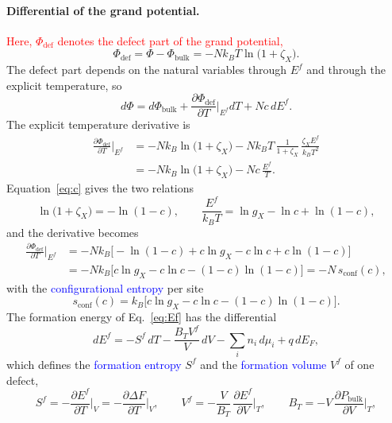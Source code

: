 \documentclass[11pt]{article}      %
\numberwithin{equation}{section}   %
\begin{document}
\paragraph{Differential of the grand potential.}
\textcolor{red}{Here, $\Phi_{\text{def}}$ denotes the defect part of the
grand potential,}
\begin{equation*}
    \Phi_{\text{def}}=\Phi-\Phi_{\text{bulk}}=-Nk_BT\ln\big(1+\zeta_X\big).
\end{equation*}
The defect part depends on the natural variables through $E^f$ and through
the explicit temperature, so
\begin{equation*}
    d\Phi=d\Phi_{\text{bulk}}
    +\frac{\partial\Phi_{\text{def}}}{\partial T}\bigg|_{E^f}dT+Nc\,dE^f.
\end{equation*}
The explicit temperature derivative is
\begin{align*}
    \frac{\partial\Phi_{\text{def}}}{\partial T}\bigg|_{E^f}
    &=-Nk_B\ln\big(1+\zeta_X\big)
    -Nk_BT\,\frac{1}{1+\zeta_X}\,\frac{\zeta_X E^f}{k_BT^2}\\
    &=-Nk_B\ln\big(1+\zeta_X\big)-Nc\,\frac{E^f}{T}.
\end{align*}
Equation~\eqref{eq:c} gives the two relations
\begin{equation}
    \boxed{\ln\big(1+\zeta_X\big)=-\ln(1-c),
    \qquad
    \frac{E^f}{k_BT}=\ln g_X-\ln c+\ln(1-c),}
    \label{eq:identities}
\end{equation}
and the derivative becomes
\begin{align*}
    \frac{\partial\Phi_{\text{def}}}{\partial T}\bigg|_{E^f}
    &=-Nk_B\big[-\ln(1-c)+c\ln g_X-c\ln c+c\ln(1-c)\big]\\
    &=-Nk_B\big[c\ln g_X-c\ln c-(1-c)\ln(1-c)\big]
    =-N\,s_{\text{conf}}(c),
\end{align*}
with the \textcolor{blue}{configurational entropy} per site
\begin{equation}
    \boxed{s_{\text{conf}}(c)=k_B\big[c\ln g_X-c\ln c-(1-c)\ln(1-c)\big].}
    \label{eq:sconf}
\end{equation}
The formation energy of Eq.~\eqref{eq:Ef} has the differential
\begin{equation*}
    dE^f=-S^f\,dT-\frac{B_TV^f}{V}\,dV-\sum_in_i\,d\mu_i+q\,dE_F,
\end{equation*}
which defines the \textcolor{blue}{formation entropy} $S^f$ and the
\textcolor{blue}{formation volume} $V^f$ of one defect,
\begin{equation*}
    S^f=-\frac{\partial E^f}{\partial T}\bigg|_{V}
    =-\frac{\partial\Delta F}{\partial T}\bigg|_{V},
    \qquad
    V^f=-\frac{V}{B_T}\,\frac{\partial E^f}{\partial V}\bigg|_{T},
    \qquad
    B_T=-V\,\frac{\partial P_{\text{bulk}}}{\partial V}\bigg|_{T},
\end{equation*}
\end{document}
